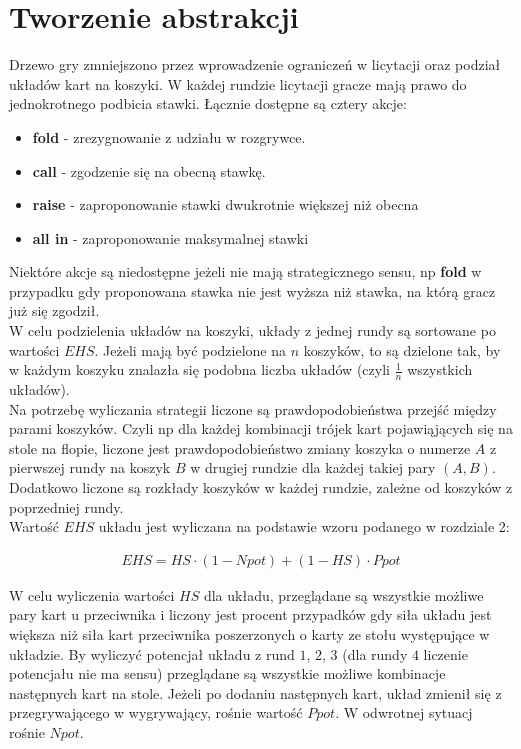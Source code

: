 \documentclass[licencjacka]{pracamgr}
\begin{document}
\section{Tworzenie abstrakcji}

Drzewo gry zmniejszono przez wprowadzenie ograniczeń w licytacji oraz podział układów kart na koszyki.
W każdej rundzie licytacji gracze mają prawo do jednokrotnego podbicia stawki. Łącznie dostępne są cztery akcje:

\begin{itemize}
\item \textbf{fold} - zrezygnowanie z udziału w rozgrywce.
\item \textbf{call} - zgodzenie się na obecną stawkę.
\item \textbf{raise} - zaproponowanie stawki dwukrotnie większej niż obecna
\item \textbf{all in} - zaproponowanie maksymalnej stawki
\end{itemize}

\noindent
Niektóre akcje są niedostępne jeżeli nie mają strategicznego sensu, np \textbf{fold} w przypadku gdy
proponowana stawka nie jest wyższa niż stawka, na którą gracz już się zgodził. \\

\noindent
W celu podzielenia układów na koszyki, układy z jednej rundy są sortowane po wartości $EHS$. Jeżeli mają być podzielone na
$n$ koszyków, to są dzielone tak, by w każdym koszyku znalazła się podobna liczba układów (czyli $\frac{1}{n}$ wszystkich układów). \\

\noindent
Na potrzebę wyliczania strategii liczone są prawdopodobieństwa przejść między parami koszyków. Czyli np dla każdej kombinacji
trójek kart pojawiąjących się na stole na flopie, liczone jest prawdopodobieństwo zmiany koszyka o numerze $A$ z pierwszej
rundy na koszyk $B$ w drugiej rundzie dla każdej takiej pary $(A, B)$. Dodatkowo liczone są rozkłady koszyków
w każdej rundzie, zależne od koszyków z poprzedniej rundy. \\

\noindent
Wartość $EHS$ układu jest wyliczana na podstawie wzoru podanego w rozdziale 2:

\begin{align*}
EHS = HS \cdot (1 - Npot) + (1 - HS) \cdot Ppot
\end{align*}

\noindent
W celu wyliczenia wartości $HS$ dla układu, przeglądane są wszystkie możliwe pary kart u przeciwnika i liczony jest procent
przypadków gdy siła układu jest większa niż siła kart przeciwnika poszerzonych o karty ze stołu występujące w układzie.
By wyliczyć potencjał układu z rund $1$, $2$, $3$ (dla rundy $4$ liczenie potencjału nie ma sensu) przeglądane są wszystkie
możliwe kombinacje następnych kart na stole. Jeżeli po dodaniu następnych kart, układ zmienił się z przegrywającego w
wygrywający, rośnie wartość $Ppot$. W odwrotnej sytuacj rośnie $Npot$.
\end{document}
